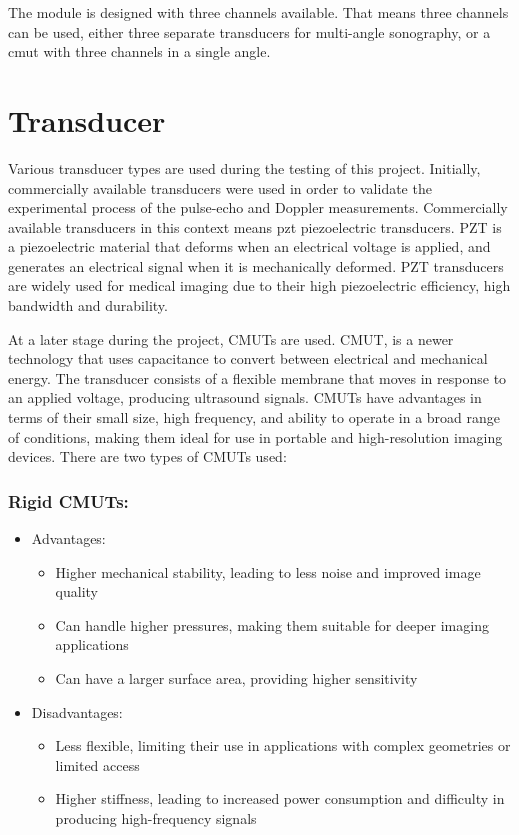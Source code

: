 The module is designed with three channels available. That means three channels can be used, either three separate transducers for multi-angle sonography, or a \gls{cmut} with three channels in a single angle.

\section{Transducer}
Various \gls{transducer} types are used during the testing of this project. Initially, commercially available transducers were used in order to validate the experimental process of the pulse-echo and Doppler measurements. Commercially available transducers in this context means \gls{pzt} \gls{piezoelectric} transducers. PZT is a piezoelectric material that deforms when an electrical voltage is applied, and generates an electrical signal when it is mechanically deformed. PZT transducers are widely used for medical imaging due to their high piezoelectric efficiency, high bandwidth and durability.

At a later stage during the project, CMUTs are used. CMUT, is a newer technology that uses capacitance to convert between electrical and mechanical energy. The transducer consists of a flexible membrane that moves in response to an applied voltage, producing ultrasound signals. CMUTs have advantages in terms of their small size, high frequency, and ability to operate in a broad range of conditions, making them ideal for use in portable and high-resolution imaging devices. There are two types of CMUTs used:

\subsubsection{Rigid CMUTs:}
\begin{itemize}
	\item Advantages:
	\begin{itemize}
		\item Higher mechanical stability, leading to less noise and improved image quality
		\item Can handle higher pressures, making them suitable for deeper imaging applications
		\item Can have a larger surface area, providing higher sensitivity
	\end{itemize}
	\item Disadvantages:
	\begin{itemize}
		\item Less flexible, limiting their use in applications with complex geometries or limited access
		\item Higher stiffness, leading to increased power consumption and difficulty in producing high-frequency signals
	\end{itemize}
\end{itemize}
